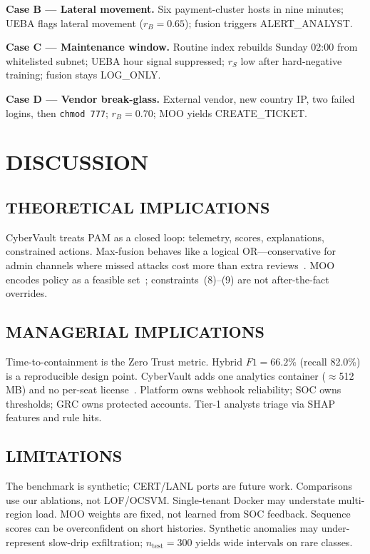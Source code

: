 \textbf{Case B --- Lateral movement.} Six payment-cluster hosts in nine minutes; UEBA flags lateral movement ($r_B=0.65$); fusion triggers ALERT\_ANALYST.

\textbf{Case C --- Maintenance window.} Routine index rebuilds Sunday 02:00 from whitelisted subnet; UEBA hour signal suppressed; $r_S$ low after hard-negative training; fusion stays LOG\_ONLY.

\textbf{Case D --- Vendor break-glass.} External vendor, new country IP, two failed logins, then \texttt{chmod 777}; $r_B=0.70$; MOO yields CREATE\_TICKET.

\section{DISCUSSION}
\label{art-sec:discussion}

\subsection{THEORETICAL IMPLICATIONS}
CyberVault treats PAM as a closed loop: telemetry, scores, explanations, constrained actions. Max-fusion behaves like a logical OR---conservative for admin channels where missed attacks cost more than extra reviews~\cite{ref6}. MOO encodes policy as a feasible set~\cite{ref14,ref15}; constraints~(8)--(9) are not after-the-fact overrides.

\subsection{MANAGERIAL IMPLICATIONS}
Time-to-containment is the Zero Trust metric. Hybrid $F1=66.2\%$ (recall 82.0\%) is a reproducible design point. CyberVault adds one analytics container ($\approx$512\,MB) and no per-seat license~\cite{ref4,ref16}. Platform owns webhook reliability; SOC owns thresholds; GRC owns protected accounts. Tier-1 analysts triage via SHAP features and rule hits.

\subsection{LIMITATIONS}
The benchmark is synthetic; CERT/LANL ports are future work. Comparisons use our ablations, not LOF/OCSVM. Single-tenant Docker may understate multi-region load. MOO weights are fixed, not learned from SOC feedback. Sequence scores can be overconfident on short histories. Synthetic anomalies may under-represent slow-drip exfiltration; $n_{\mathrm{test}}=300$ yields wide intervals on rare classes.

